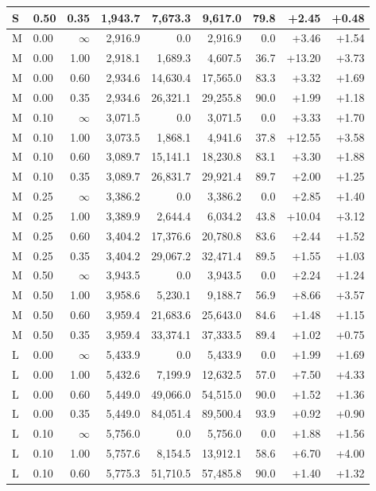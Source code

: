 \documentclass[10pt,a4paper]{article}
\begin{document}
\begin{table}[H]
\begin{tabular}{@{}llrrrrrrr@{}}
S & 0.50 & 0.35 & 1,943.7 & 7,673.3 & 9,617.0 & 79.8 & +2.45 & +0.48\\
\midrule
M & 0.00 & $\infty$ & 2,916.9 & 0.0 & 2,916.9 & 0.0 & +3.46 & +1.54\\
M & 0.00 & 1.00 & 2,918.1 & 1,689.3 & 4,607.5 & 36.7 & +13.20 & +3.73\\
M & 0.00 & 0.60 & 2,934.6 & 14,630.4 & 17,565.0 & 83.3 & +3.32 & +1.69\\
M & 0.00 & 0.35 & 2,934.6 & 26,321.1 & 29,255.8 & 90.0 & +1.99 & +1.18\\
M & 0.10 & $\infty$ & 3,071.5 & 0.0 & 3,071.5 & 0.0 & +3.33 & +1.70\\
M & 0.10 & 1.00 & 3,073.5 & 1,868.1 & 4,941.6 & 37.8 & +12.55 & +3.58\\
M & 0.10 & 0.60 & 3,089.7 & 15,141.1 & 18,230.8 & 83.1 & +3.30 & +1.88\\
M & 0.10 & 0.35 & 3,089.7 & 26,831.7 & 29,921.4 & 89.7 & +2.00 & +1.25\\
M & 0.25 & $\infty$ & 3,386.2 & 0.0 & 3,386.2 & 0.0 & +2.85 & +1.40\\
M & 0.25 & 1.00 & 3,389.9 & 2,644.4 & 6,034.2 & 43.8 & +10.04 & +3.12\\
M & 0.25 & 0.60 & 3,404.2 & 17,376.6 & 20,780.8 & 83.6 & +2.44 & +1.52\\
M & 0.25 & 0.35 & 3,404.2 & 29,067.2 & 32,471.4 & 89.5 & +1.55 & +1.03\\
M & 0.50 & $\infty$ & 3,943.5 & 0.0 & 3,943.5 & 0.0 & +2.24 & +1.24\\
M & 0.50 & 1.00 & 3,958.6 & 5,230.1 & 9,188.7 & 56.9 & +8.66 & +3.57\\
M & 0.50 & 0.60 & 3,959.4 & 21,683.6 & 25,643.0 & 84.6 & +1.48 & +1.15\\
M & 0.50 & 0.35 & 3,959.4 & 33,374.1 & 37,333.5 & 89.4 & +1.02 & +0.75\\
\midrule
L & 0.00 & $\infty$ & 5,433.9 & 0.0 & 5,433.9 & 0.0 & +1.99 & +1.69\\
L & 0.00 & 1.00 & 5,432.6 & 7,199.9 & 12,632.5 & 57.0 & +7.50 & +4.33\\
L & 0.00 & 0.60 & 5,449.0 & 49,066.0 & 54,515.0 & 90.0 & +1.52 & +1.36\\
L & 0.00 & 0.35 & 5,449.0 & 84,051.4 & 89,500.4 & 93.9 & +0.92 & +0.90\\
L & 0.10 & $\infty$ & 5,756.0 & 0.0 & 5,756.0 & 0.0 & +1.88 & +1.56\\
L & 0.10 & 1.00 & 5,757.6 & 8,154.5 & 13,912.1 & 58.6 & +6.70 & +4.00\\
L & 0.10 & 0.60 & 5,775.3 & 51,710.5 & 57,485.8 & 90.0 & +1.40 & +1.32\\

\end{tabular}
\end{table}
\end{document}
